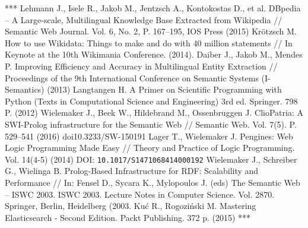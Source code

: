 \documentclass[conference,a4paper]{IEEEtran}
\providecommand\url[1]{\texttt{#1}}
\begin{document}
\begin{thebibliography}{99}
 ***
  Lehmann J., Isele R., Jakob M., Jentzsch A., Kontokostas D., et al.
  DBpedia -- A Large-scale, Multilingual Knowledge Base Extracted from
  Wikipedia // Semantic Web Journal. Vol. 6, No. 2, P. 167--195,
  IOS Press (2015)
  Krötzsch M. How to use Wikidata: Things to make and do with 40 million
  statements // In Keynote at the 10th Wikimania Conference. (2014).
  Daiber J., Jakob M., Mendes P. Improving Efficiency and Accuracy in
  Multilingual Entity Extraction // Proceedings of the 9th International
  Conference on Semantic Systems (I-Semantics) (2013)
  Langtangen H. A Primer on Scientific Programming with Python (Texts in
  Computational Science and Engineering) 3rd ed. Springer. 798 P. (2012)
  Wielemaker J., Beek W., Hildebrand M., Ossenbruggen J. ClioPatria: A
  SWI-Prolog infrastructure for the Semantic Web // Semantic Web.
  Vol. 7(5). P. 529--541 (2016) doi{10.3233/SW-150191}
  Lager T., Wielemaker J. Pengines: Web Logic Programming Made Easy //
  Theory and Practice of Logic Programming. Vol. 14(4-5) (2014)
DOI: \url{10.1017/S1471068414000192}
  Wielemaker J., Schreiber G., Wielinga B. Prolog-Based Infrastructure
  for RDF: Scalability and Performance // In: Fensel D., Sycara K.,
  Mylopoulos J. (eds) The Semantic Web -- ISWC 2003. ISWC 2003. Lecture
  Notes in Computer Science. Vol. 2870. Springer, Berlin,
  Heidelberg (2003.
  Kuć R., Rogoziński M. Mastering Elasticsearch - Second Edition. Packt
  Publishing. 372 p. (2015)
 ***

\end{thebibliography}
\end{document}
